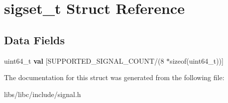 \hypertarget{structsigset__t}{}\section{sigset\+\_\+t Struct Reference}
\label{structsigset__t}
\subsection*{Data Fields}
\begin{DoxyCompactItemize}
\item 
uint64\+\_\+t {\bfseries val} \mbox{[}S\+U\+P\+P\+O\+R\+T\+E\+D\+\_\+\+S\+I\+G\+N\+A\+L\+\_\+\+C\+O\+U\+NT/(8 $\ast$sizeof(uint64\+\_\+t))\mbox{]}\hypertarget{structsigset__t_a07f9b3284d5bb15f53709c669fd90449}{}\label{structsigset__t_a07f9b3284d5bb15f53709c669fd90449}

\end{DoxyCompactItemize}


The documentation for this struct was generated from the following file\+:\begin{DoxyCompactItemize}
\item 
libs/libc/include/signal.\+h\end{DoxyCompactItemize}
